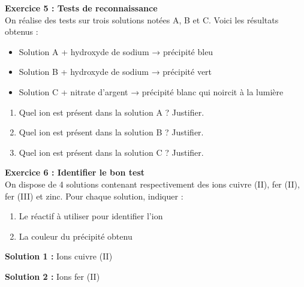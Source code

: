 \documentclass[11pt,a4paper]{article}
\newcommand{\cadreblanc}[1]{%
	\medskip\framebox[\linewidth][c]{%
		\rule{0mm}{#1mm}}\par
	\medskip}
\begin{document}
	\textbf{Exercice 5 : Tests de reconnaissance} \\
	
	On réalise des tests sur trois solutions notées A, B et C. Voici les résultats obtenus :
	
	\begin{itemize}
		\item Solution A + hydroxyde de sodium → précipité bleu
		\item Solution B + hydroxyde de sodium → précipité vert
		\item Solution C + nitrate d'argent → précipité blanc qui noircit à la lumière
	\end{itemize}
	
	\vspace{5mm}
	
	\begin{enumerate}
		\item Quel ion est présent dans la solution A ? Justifier.
		
		\cadreblanc{20}
		
		\item Quel ion est présent dans la solution B ? Justifier.
		
		\cadreblanc{20}
		
		\item Quel ion est présent dans la solution C ? Justifier.
		
		\cadreblanc{20}
	\end{enumerate}
	
	\vfill
	
	\textbf{Exercice 6 : Identifier le bon test} \\
	
	On dispose de 4 solutions contenant respectivement des ions cuivre (II), fer (II), fer (III) et zinc. Pour chaque solution, indiquer :
	
	\begin{enumerate}[label=\alph*)]
		\item Le réactif à utiliser pour identifier l'ion
		\item La couleur du précipité obtenu
	\end{enumerate}
	
	\vspace{5mm}
	
	\textbf{Solution 1 :} Ions cuivre (II) 
	
	\cadreblanc{20}
	
	\textbf{Solution 2 :} Ions fer (II) 
	
\end{document}
